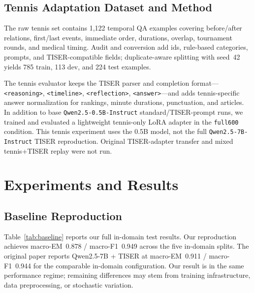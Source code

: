\documentclass[conference]{IEEEtran}
\begin{document}
\subsection{Tennis Adaptation Dataset and Method}

The raw tennis set contains 1,122 temporal QA examples covering before/after relations, first/last events, immediate order, durations, overlap, tournament rounds, and medical timing. Audit and conversion add ids, rule-based categories, prompts, and TISER-compatible fields; duplicate-aware splitting with seed~42 yields 785 train, 113 dev, and 224 test examples.

The tennis evaluator keeps the TISER parser and completion format---\texttt{<reasoning>}, \texttt{<timeline>}, \texttt{<reflection>}, \texttt{<answer>}---and adds tennis-specific answer normalization for rankings, minute durations, punctuation, and articles. In addition to base \texttt{Qwen2.5-0.5B-Instruct} standard/TISER-prompt runs, we trained and evaluated a lightweight tennis-only LoRA adapter in the \texttt{full600} condition. This tennis experiment uses the 0.5B model, not the full \texttt{Qwen2.5-7B-Instruct} TISER reproduction. Original TISER-adapter transfer and mixed tennis+TISER replay were not run.

\section{Experiments and Results}

\subsection{Baseline Reproduction}

Table~\ref{tab:baseline} reports our full in-domain test results. Our reproduction achieves macro-EM~0.878 / macro-F1~0.949 across the five in-domain splits. The original paper reports Qwen2.5-7B + TISER at macro-EM~0.911 / macro-F1~0.944 for the comparable in-domain configuration. Our result is in the same performance regime; remaining differences may stem from training infrastructure, data preprocessing, or stochastic variation.
\end{document}
